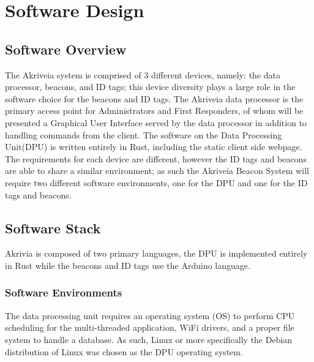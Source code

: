 

\setcounter{section}{5}
\section{Software Design}
\bigskip


\subsection{Software Overview}
\medskip
The Akriveia system is comprised of 3 different devices, namely: the data processor, beacons, and ID tags; this device diversity plays a large role in the software choice for the beacons and ID tags.
The Akriveia data processor is the primary access point for Administrators and First Responders, of whom will be presented a Graphical User Interface served by the data processor in addition to handling commands from the client.
The software on the Data Processing Unit(DPU) is written entirely in Rust, including the static client side webpage.
The requirements for each device are different, however the ID tags and beacons are able to share a similar environment; as such the Akriveia Beacon System will require two different software environments, one for the DPU and one for the ID tags and beacons.

\medskip
\subsection{Software Stack}
\medskip
Akrivia is composed of two primary languages, the DPU is implemented entirely in Rust while the beacons and ID tags use the Arduino language.

\medskip
\subsubsection{Software Environments}
\medskip
The data processing unit requires an operating system (\Gls{OS}) to perform CPU scheduling for the multi-threaded application, WiFi drivers, and a proper file system to handle a database.
As such, Linux or more specifically the \Gls{Debian} distribution of Linux was chosen as the DPU operating system.

